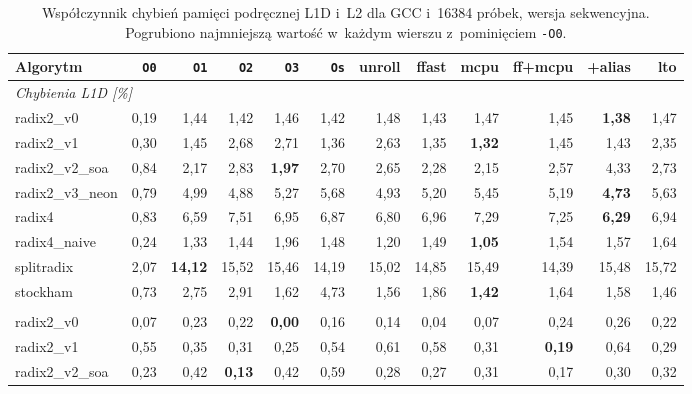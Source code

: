 \begin{table}[H]
\centering
\caption{Współczynnik chybień pamięci podręcznej L1D i~L2 dla GCC i~16384 próbek, wersja sekwencyjna. Pogrubiono najmniejszą wartość w~każdym wierszu z~pominięciem \texttt{-O0}.}
\label{tab:cache-gcc-16k}
\scriptsize
\setlength{\tabcolsep}{3.0pt}
\begin{tabular}{lrrrrrrrrrrr}
\toprule
Algorytm & \texttt{O0} & \texttt{O1} & \texttt{O2} & \texttt{O3} & \texttt{Os} & unroll & ffast & mcpu & ff+mcpu & +alias & lto \\
\midrule
\multicolumn{12}{l}{\textit{Chybienia L1D [\%]}} \\[2pt]
radix2\_v0 & 0,19 & 1,44 & 1,42 & 1,46 & 1,42 & 1,48 & 1,43 & 1,47 & 1,45 & \textbf{1,38} & 1,47 \\
radix2\_v1 & 0,30 & 1,45 & 2,68 & 2,71 & 1,36 & 2,63 & 1,35 & \textbf{1,32} & 1,45 & 1,43 & 2,35 \\
radix2\_v2\_soa & 0,84 & 2,17 & 2,83 & \textbf{1,97} & 2,70 & 2,65 & 2,28 & 2,15 & 2,57 & 4,33 & 2,73 \\
radix2\_v3\_neon & 0,79 & 4,99 & 4,88 & 5,27 & 5,68 & 4,93 & 5,20 & 5,45 & 5,19 & \textbf{4,73} & 5,63 \\
radix4 & 0,83 & 6,59 & 7,51 & 6,95 & 6,87 & 6,80 & 6,96 & 7,29 & 7,25 & \textbf{6,29} & 6,94 \\
radix4\_naive & 0,24 & 1,33 & 1,44 & 1,96 & 1,48 & 1,20 & 1,49 & \textbf{1,05} & 1,54 & 1,57 & 1,64 \\
splitradix & 2,07 & \textbf{14,12} & 15,52 & 15,46 & 14,19 & 15,02 & 14,85 & 15,49 & 14,39 & 15,48 & 15,72 \\
stockham & 0,73 & 2,75 & 2,91 & 1,62 & 4,73 & 1,56 & 1,86 & \textbf{1,42} & 1,64 & 1,58 & 1,46 \\
\addlinespace
\multicolumn{12}{l}{\textit{Chybienia L2 [\%]}} \\[2pt]
radix2\_v0 & 0,07 & 0,23 & 0,22 & \textbf{0,00} & 0,16 & 0,14 & 0,04 & 0,07 & 0,24 & 0,26 & 0,22 \\
radix2\_v1 & 0,55 & 0,35 & 0,31 & 0,25 & 0,54 & 0,61 & 0,58 & 0,31 & \textbf{0,19} & 0,64 & 0,29 \\
radix2\_v2\_soa & 0,23 & 0,42 & \textbf{0,13} & 0,42 & 0,59 & 0,28 & 0,27 & 0,31 & 0,17 & 0,30 & 0,32 \\

\end{tabular}
\end{table}
